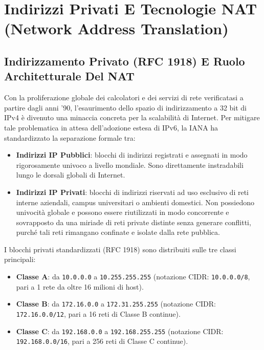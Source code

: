 \documentclass[11pt, a4paper]{article}
\begin{document}
\newpage
\section{Indirizzi Privati E Tecnologie NAT (Network Address Translation)}

\subsection{Indirizzamento Privato (RFC 1918) E Ruolo Architetturale Del NAT}
Con la proliferazione globale dei calcolatori e dei servizi di rete verificatasi a partire dagli anni '90, l'esaurimento dello spazio di indirizzamento a 32 bit di IPv4 è divenuto una minaccia concreta per la scalabilità di Internet. Per mitigare tale problematica in attesa dell'adozione estesa di IPv6, la IANA ha standardizzato la separazione formale tra:
\begin{itemize}
    \item \textbf{Indirizzi IP Pubblici}: blocchi di indirizzi registrati e assegnati in modo rigorosamente univoco a livello mondiale. Sono direttamente instradabili lungo le dorsali globali di Internet.
    \item \textbf{Indirizzi IP Privati}: blocchi di indirizzi riservati ad uso esclusivo di reti interne aziendali, campus universitari o ambienti domestici. Non possiedono univocità globale e possono essere riutilizzati in modo concorrente e sovrapposto da una miriade di reti private distinte senza generare conflitti, purché tali reti rimangano confinate e isolate dalla rete pubblica.
\end{itemize}


I blocchi privati standardizzati (RFC 1918) sono distribuiti sulle tre classi principali:
\begin{itemize}
    \item \textbf{Classe A}: da \texttt{10.0.0.0} a \texttt{10.255.255.255} (notazione CIDR: \texttt{10.0.0.0/8}, pari a 1 rete da oltre 16 milioni di host).
    \item \textbf{Classe B}: da \texttt{172.16.0.0} a \texttt{172.31.255.255} (notazione CIDR: \texttt{172.16.0.0/12}, pari a 16 reti di Classe B continue).
    \item \textbf{Classe C}: da \texttt{192.168.0.0} a \texttt{192.168.255.255} (notazione CIDR: \texttt{192.168.0.0/16}, pari a 256 reti di Classe C continue).
\end{itemize}
\end{document}
